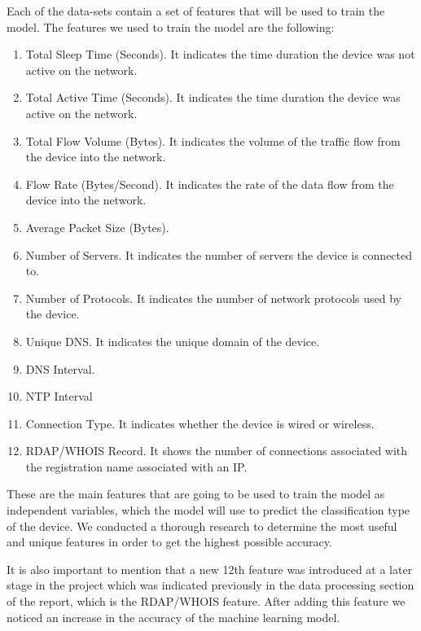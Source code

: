 \documentclass{article}
\begin{document}
Each of the data-sets contain a set of features that will be used to train the model. The features we used to train the model are the following:
\begin{enumerate}
    \item	Total Sleep Time (Seconds). It indicates the time duration the device was not active on the network. 
    \item	Total Active Time (Seconds). It indicates the time duration the device was active on the network.
    \item	Total Flow Volume (Bytes). It indicates the volume of the traffic flow from the device into the network.
    \item	Flow Rate (Bytes/Second). It indicates the rate of the data flow from the device into the network.
    \item	Average Packet Size (Bytes).
    \item	Number of Servers. It indicates the number of servers the device is connected to.
    \item	Number of Protocols. It indicates the number of network protocols used by the device.
    \item	Unique DNS. It indicates the unique domain of the device.
    \item	DNS Interval. 
    \item	NTP Interval
    \item	Connection Type. It indicates whether the device is wired or wireless.
    \item	RDAP/WHOIS Record. It shows the number of connections associated with the registration name associated with an IP.\newline
\end{enumerate}

These are the main features that are going to be used to train the model as independent variables, which the model will use to predict the classification type of the device. We conducted a thorough research to determine the most useful and unique features in order to get the highest possible accuracy. \newline

It is also important to mention that a new 12th feature was introduced at a later stage in the project which was indicated previously in the data processing section of the report, which is the RDAP/WHOIS feature. After adding this feature we noticed an increase in the accuracy of the machine learning model.\newline
\end{document}
